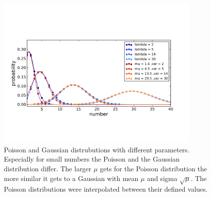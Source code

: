 \begin{figure}
\centering
\includegraphics[width = 0.9\textwidth]{pictures/poissgaussdistr.png}
	\caption{Poisson and Gaussian distrubutions with different parameters. Especially for small numbers the Poisson and the Gaussian distribution differ. The larger $\mu$ gets for the Poisson distribution the more similar it gets to a Gaussian with mean $\mu$ and sigma $\sqrt{\mu}$. The Poisson distributions were interpolated between their defined values.}
	\label{poisgaussdistr}
\end{figure}

